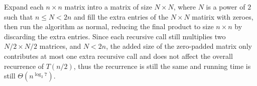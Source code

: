 Expand each $n \times n$ matrix intro a matrix of size $N \times N$, where $N$ is a power of $2$ such that $n \leq N < 2n$ and fill the extra entries of the $N \times N$ matirix with zeroes, then run the algorithm as normal, reducing the final product to size $n \times n$ by discarding the extra entries. Since each recursive call still multiplies two $N/2 \times N/2$ matrices, and $N < 2n$, the added size of the zero-padded matrix only contributes at most one extra recursive call and does not affect the overall recurrence of $T(n/2)$, thus the recurrence is still the same and running time is still $\Theta(n^{\log_2 7})$.
